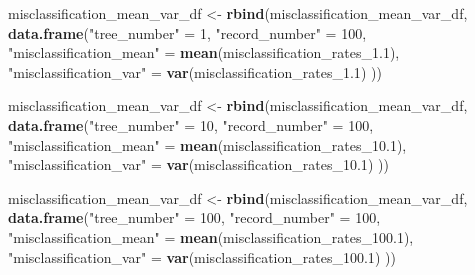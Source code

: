 \documentclass[
]{article}
\newenvironment{Shaded}{\begin{snugshade}}{\end{snugshade}}
\newcommand{\DecValTok}[1]{\textcolor[rgb]{0.00,0.00,0.81}{#1}}
\newcommand{\FloatTok}[1]{\textcolor[rgb]{0.00,0.00,0.81}{#1}}
\newcommand{\FunctionTok}[1]{\textcolor[rgb]{0.13,0.29,0.53}{\textbf{#1}}}
\newcommand{\NormalTok}[1]{#1}
\newcommand{\OtherTok}[1]{\textcolor[rgb]{0.56,0.35,0.01}{#1}}
\newcommand{\StringTok}[1]{\textcolor[rgb]{0.31,0.60,0.02}{#1}}
\begin{document}
\begin{Shaded}
\begin{Highlighting}[]
\NormalTok{misclassification\_mean\_var\_df }\OtherTok{\textless{}{-}} \FunctionTok{rbind}\NormalTok{(misclassification\_mean\_var\_df, }
                                      \FunctionTok{data.frame}\NormalTok{(}\StringTok{"tree\_number"} \OtherTok{=} \DecValTok{1}\NormalTok{, }
                                                 \StringTok{"record\_number"} \OtherTok{=} \DecValTok{100}\NormalTok{,}
                                                 \StringTok{"misclassification\_mean"} \OtherTok{=} \FunctionTok{mean}\NormalTok{(misclassification\_rates\_1}\FloatTok{.1}\NormalTok{),}
                                                 \StringTok{"misclassification\_var"} \OtherTok{=} \FunctionTok{var}\NormalTok{(misclassification\_rates\_1}\FloatTok{.1}\NormalTok{)}
\NormalTok{                                                 ))}

\NormalTok{misclassification\_mean\_var\_df }\OtherTok{\textless{}{-}} \FunctionTok{rbind}\NormalTok{(misclassification\_mean\_var\_df, }
                                      \FunctionTok{data.frame}\NormalTok{(}\StringTok{"tree\_number"} \OtherTok{=} \DecValTok{10}\NormalTok{, }
                                                 \StringTok{"record\_number"} \OtherTok{=} \DecValTok{100}\NormalTok{,}
                                                 \StringTok{"misclassification\_mean"} \OtherTok{=} \FunctionTok{mean}\NormalTok{(misclassification\_rates\_10}\FloatTok{.1}\NormalTok{),}
                                                 \StringTok{"misclassification\_var"} \OtherTok{=} \FunctionTok{var}\NormalTok{(misclassification\_rates\_10}\FloatTok{.1}\NormalTok{)}
\NormalTok{                                                 ))}

\NormalTok{misclassification\_mean\_var\_df }\OtherTok{\textless{}{-}} \FunctionTok{rbind}\NormalTok{(misclassification\_mean\_var\_df, }
                                      \FunctionTok{data.frame}\NormalTok{(}\StringTok{"tree\_number"} \OtherTok{=} \DecValTok{100}\NormalTok{, }
                                                 \StringTok{"record\_number"} \OtherTok{=} \DecValTok{100}\NormalTok{,}
                                                 \StringTok{"misclassification\_mean"} \OtherTok{=} \FunctionTok{mean}\NormalTok{(misclassification\_rates\_100}\FloatTok{.1}\NormalTok{),}
                                                 \StringTok{"misclassification\_var"} \OtherTok{=} \FunctionTok{var}\NormalTok{(misclassification\_rates\_100}\FloatTok{.1}\NormalTok{)}
\NormalTok{                                                 ))}


\end{Highlighting}
\end{Shaded}
\end{document}
